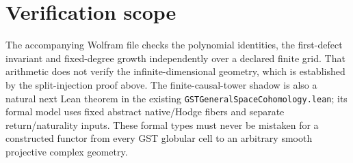 \documentclass[11pt]{article}
\begin{document}
\section{Verification scope}
The accompanying Wolfram file checks the polynomial
identities, the first-defect invariant and fixed-degree
growth independently over a declared finite grid.
That arithmetic does not verify the infinite-dimensional
geometry, which is established by the split-injection
proof above. The finite-causal-tower shadow is also a
natural next Lean theorem in the existing
\texttt{GSTGeneralSpaceCohomology.lean}; its formal
model uses fixed abstract native/Hodge fibers and
separate return/naturality inputs. These formal types
must never be mistaken for a constructed functor from
every GST globular cell to an arbitrary smooth projective
complex geometry.
\end{document}
